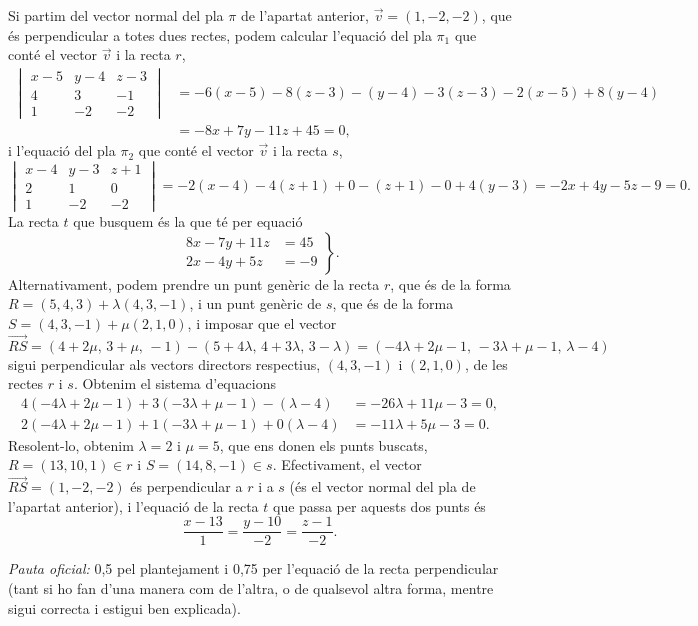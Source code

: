 \begin{apartats}
\begin{solucio}
Si partim del vector normal del pla $\pi$ de l'apartat anterior, $\vec v=(1,-2,-2)$, que és perpendicular a totes
dues rectes, podem calcular l'equació del pla $\pi_1$ que conté el vector $\vec v$ i la recta $r$,
\begin{align*}
\begin{vmatrix}x-5&y-4&z-3\\4&3&-1\\1&-2&-2\end{vmatrix}
&=-6(x-5)-8(z-3)-(y-4)-3(z-3)-2(x-5)+8(y-4)\\
&=-8x+7y-11z+45=0,
\end{align*}
i l'equació del pla $\pi_2$ que conté el vector $\vec v$ i la recta $s$,
\[
\begin{vmatrix}x-4&y-3&z+1\\2&1&0\\1&-2&-2\end{vmatrix}=-2(x-4)-4(z+1)+0-(z+1)-0+4(y-3)=-2x+4y-5z-9=0 .
\]
La recta $t$ que busquem és la que té per equació
\[
\left.\begin{aligned}8x-7y+11z&=45\\2x-4y+5z&=-9\end{aligned}\right\}.
\]
Alternativament, podem prendre un punt genèric de la recta $r$, que és de la forma $R=(5,4,3)+\lambda(4,3,-1)$, i
un punt genèric de $s$, que és de la forma $S=(4,3,-1)+\mu(2,1,0)$, i imposar que el vector
\[
\overrightarrow{RS}=(4+2\mu,\,3+\mu,\,-1)-(5+4\lambda,\,4+3\lambda,\,3-\lambda)=(-4\lambda+2\mu-1,\,-3\lambda+\mu-1,\,\lambda-4)
\]
sigui perpendicular als vectors directors respectius, $(4,3,-1)$ i $(2,1,0)$, de les rectes $r$ i $s$. Obtenim el
sistema d'equacions
\begin{align*}
4(-4\lambda+2\mu-1)+3(-3\lambda+\mu-1)-(\lambda-4)&=-26\lambda+11\mu-3=0,\\
2(-4\lambda+2\mu-1)+1(-3\lambda+\mu-1)+0(\lambda-4)&=-11\lambda+5\mu-3=0 .
\end{align*}
Resolent-lo, obtenim $\lambda=2$ i $\mu=5$, que ens donen els punts buscats, $R=(13,10,1)\in r$ i
$S=(14,8,-1)\in s$. Efectivament, el vector $\overrightarrow{RS}=(1,-2,-2)$ és perpendicular a $r$ i a $s$ (és el
vector normal del pla de l'apartat anterior), i l'equació de la recta $t$ que passa per aquests dos punts és
\[
\frac{x-13}{1}=\frac{y-10}{-2}=\frac{z-1}{-2}.
\]

\textit{Pauta oficial:} 0,5 pel plantejament i 0,75 per l'equació de la recta perpendicular (tant si ho fan
d'una manera com de l'altra, o de qualsevol altra forma, mentre sigui correcta i estigui ben explicada).
\end{solucio}

\end{apartats}
